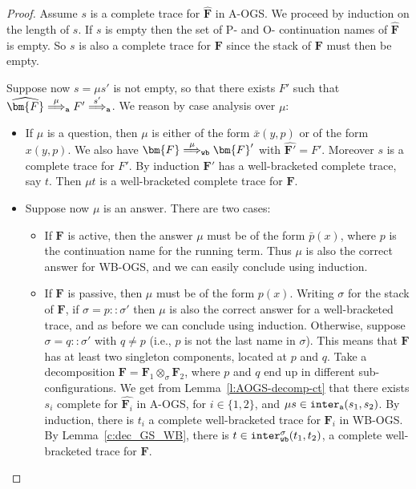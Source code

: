 \documentclass[11pt,a4paper]{amsart}
\theoremstyle{plain}
\theoremstyle{definition}
\theoremstyle{defC}
\theoremstyle{thmC}
\theoremstyle{plain}
\numberwithin{equation}{section}
\newcommand{\wrt}{with respect to\xspace}  %
\newcommand{\trace}{s}
\newcommand{\tracerho}{t}
\newcommand{\stt}{\sigma}
\newcommand{\stti}{\sigma_i}
\newcommand{\sttp}{\sigma'}
\newcommand{\AOGS}{\mbox{{\rm A-OGS}}\xspace}      %
\newcommand{\WBOGS}{\mbox{{\rm WB-OGS}}\xspace}      %
\newcommand{\rmm}[1]{{\tt{\lowercase{#1}}}}
\newcommand{\genArr}[2]{\mathrel{\stackrel{{#1}}{\Longrightarrow}_{\rmm{\lowercase{#2}}}}}  %
\newcommand{\ArrA}[1]{\genArr{#1}{A}}  %
\newcommand{\ArrWB}[1]{\genArr{#1}{WB}}          %
\newcommand{\interlA}[2]{{\tt inter_{a}}( #1, #2)}
\newcommand{\interlWBs}[3]{{\tt inter_{wb}^{#1}}( #2, #3)}
\newcommand{\FF}{F}
\newcommand{\FFb}{{\bm{\FF}}} %
\newcommand{\es}{\eraseStack}
\newcommand{\ansP}[2]{\bar{#1}(#2)}
\newcommand{\questPV}[3]{\bar{#1}(#2,#3)}
\newcommand{\ansO}[2]{#1(#2)}
\newcommand{\questOV}[3]{#1(#2,#3)}
\newcommand{\eraseStack}[1]{\widehat{#1}}
\theoremstyle{plain}
\theoremstyle{definition}
\begin{document}
\begin{proof}
Assume $\trace$ is a complete trace for $\es\FFb$ in \AOGS.
We proceed by induction on the length of $\trace$. 
If $\trace$ is empty then the set of P- and O- continuation names of
$\es\FFb$ is empty.
So $\trace$ is also a complete trace for $\FFb$
since the stack of $\FFb$ must then be empty.

Suppose now $\trace = \mu \trace'$ is not empty,
so that there exists $\FF'$
such that $\es{\FFb} \ArrA \mu \FF' \ArrA{\trace'}$.
We reason by case analysis over $\mu$:
\begin{itemize}
\item If $\mu$ is a question,  then $\mu$ is either 
of the form $\questPV{x}{y}{p}$ 
or of the form $ \questOV{x}{y}{p}$.
We also have $\FFb  \ArrWB \mu \FFb'$
with 
$\es{\FFb'}= \FF'$.
Moreover $\trace $ is a complete trace %
for $\FF'$. 
By induction $\FFb'$ 
has a well-bracketed complete trace, %
say $\tracerho$.
Then $\mu \tracerho$ is a well-bracketed complete trace %
for $\FFb$. 
\item Suppose now $\mu$ is an answer. There are two cases:
\begin{itemize}
\item If $\FFb$ is active, then the answer $\mu$ must be of the form 
$\ansP{p}{x}$, where $p$ is the continuation name for the running term.
Thus $\mu$ is also the correct answer for \WBOGS, and we can easily conclude using
induction. 
\item If $\FFb$ is passive, then 
 $\mu$ must be of the form 
 $\ansO{p}{x}$. Writing $\stt$ for the stack of $\FFb$,
 if $\stt = p::\sttp$ then $\mu$ is also    
 the correct answer for a well-bracketed trace, and as before  we can conclude using
 induction.  Otherwise, suppose 
 $\stt = q::\sttp$ with $q\neq p$
 (i.e., $p$ is not the last  name in $\stt$).
 This means that $\FFb$ has at least two
 singleton components, located at $p$ and $q$. 
 Take a decomposition
 $\FFb = \FFb_1 \otimes_{\sigma} \FFb_2 $,    
 where $p$ and $q$ end up in different sub-configurations. 
 We get from Lemma~\ref{l:AOGS-decomp-ct}
 that there exists $\trace_i$ complete for $\es{\FFb_i}$ in \AOGS, 
 for $i\in \{1,2\}$, and 
 $\mu \trace \in \interlA{\trace_1}{\trace_2}$.
 By induction, there is $ \tracerho_i $ a complete well-bracketed trace 
 for $\FFb_i$ in \WBOGS.
%
 By Lemma~\ref{c:dec_GS_WB}, 
 there is $\tracerho \in \interlWBs{\stt}{\tracerho_1}{\tracerho_2}$, 
 a complete well-bracketed trace for $\FFb$.
\qedhere
\end{itemize}
\end{itemize}
\end{proof} 
\end{document}
